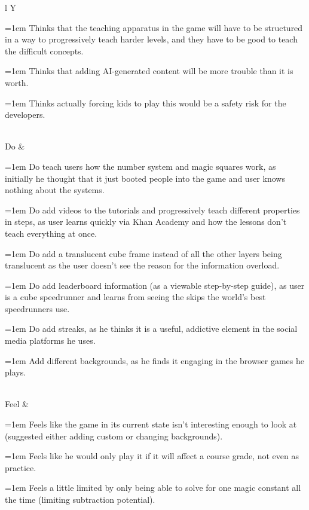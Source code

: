 \documentclass{article}
\newcommand{\cellbullet}{\par\noindent\hangindent=1em\hangafter=1%
  \makebox[1em][l]{\textbullet}\ignorespaces}
\newenvironment{empathylist}
  {\begin{minipage}[t]{\linewidth}\let\item\cellbullet}
  {\strut\end{minipage}}
\begin{document}
\begin{tabularx}{\textwidth}{l Y}
\begin{empathylist}
  \item Thinks that the teaching apparatus in the game will have to be structured in a way to progressively teach harder levels, and they have to be good to teach the difficult concepts.
  \item Thinks that adding AI-generated content will be more trouble than it is worth.
  \item Thinks actually forcing kids to play this would be a safety risk for the developers.
\end{empathylist} \\
\midrule
Do &
\begin{empathylist}
  \item Do teach users how the number system and magic squares work, as initially he thought that it just booted people into the game and user knows nothing about the systems.
  \item Do add videos to the tutorials and progressively teach different properties in steps, as user learns quickly via Khan Academy and how the lessons don't teach everything at once.
  \item Do add a translucent cube frame instead of all the other layers being translucent as the user doesn't see the reason for the information overload.
  \item Do add leaderboard information (as a viewable step-by-step guide), as user is a cube speedrunner and learns from seeing the skips the world's best speedrunners use. 
  \item Do add streaks, as he thinks it is a useful, addictive element in the social media platforms he uses.
  \item Add different backgrounds, as he finds it engaging in the browser games he plays.
\end{empathylist}\\
\midrule
Feel &
\begin{empathylist}
  \item Feels like the game in its current state isn't interesting enough to look at (suggested either adding custom or changing backgrounds).
  \item Feels like he would only play it if it will affect a course grade, not even as practice.
  \item Feels a little limited by only being able to solve for one magic constant all the time (limiting subtraction potential).
\end{empathylist} \\
\end{tabularx}
\end{document}
